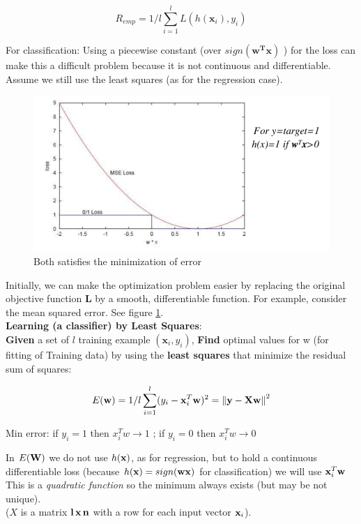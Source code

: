 \documentclass[../main.tex]{subfiles}
\begin{document}
$$ R_{emp} = 1/l\sum_{i = 1}^{l} L(h(\mathbf{x}_i),y_i) $$

For classification: Using a piecewise constant (over $sign(\mathbf{w^Tx})$ ) for the loss can make this a difficult problem because it is not continuous and differentiable. Assume we still use the least squares (as for the regression case).\\

\begin{figure}[H]
    \centering
    \includegraphics[scale = 0.3]{lectures/2_linear_model/2_loss_classification_smo.png}
    \caption{Both satisfies the minimization of error}
    \label{fig:2_loss_classification_smo}
\end{figure}
Initially, we can make the optimization problem easier by replacing the original objective function \textbf{L} by a smooth, differentiable function. For example, consider the mean squared error. See figure \ref{fig:2_loss_classification_smo}.\\

\noindent \textbf{Learning (a classifier) by Least Squares}:\\

\noindent\textbf{Given} a set of $l$ training example $( \mathbf{x}_i, y_i)$, \textbf{Find} optimal values for w (for fitting of Training data) by using the \textbf{least squares} that minimize the residual sum of squares:

$$ E(\bold{w}) = 1/l \sum_{i = 1}^{l} (y_i - \bold{x}_i^T\bold{w})^2 = \left\lVert\bold{y} - \bold{Xw} \right\rVert ^2$$

\begin{center}
    Min error: if $y_i=1$ then $x_i^Tw\rightarrow 1$ ; if $y_i=0$ then  $x_i^Tw\rightarrow 0$
\end{center} 

In $E(\bold{W})$ we do not use $h(\bold{x})$, as for regression, but to hold a continuous differentiable loss (because $h(\bold{x})=sign(\bold{wx})$ for classification) we will use $\bold{x}_i^T\bold{w}$\\
This is a \emph{quadratic function} so the minimum always exists (but may be not unique).\\
($X$ is a matrix $\bold{l\, x\, n}$ with a row for each input vector $\bold{x}_i$).
\end{document}
